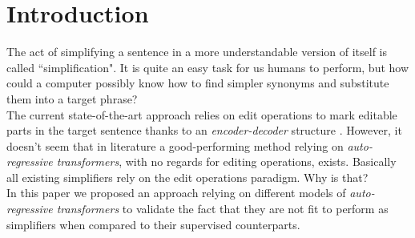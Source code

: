 \section{Introduction}
The act of simplifying a sentence in a more understandable version of itself is called ``simplification".
It is quite an easy task for us humans to perform, but how could a computer possibly know how to
find simpler synonyms and substitute them into a target phrase? \\ 
The current state-of-the-art approach relies on edit operations to mark editable parts in the 
target sentence thanks to an \textit{encoder-decoder} structure \cite{dong-etal-2019-editnts}.
However, it doesn't seem that in literature a good-performing method relying on \textit{auto-regressive transformers},
with no regards for editing operations, exists. 
Basically all existing simplifiers rely on the edit operations paradigm. Why is that? \\
In this paper we proposed an approach relying on different models of \textit{auto-regressive transformers} to validate
the fact that they are not fit to perform as simplifiers when compared to their supervised counterparts.
